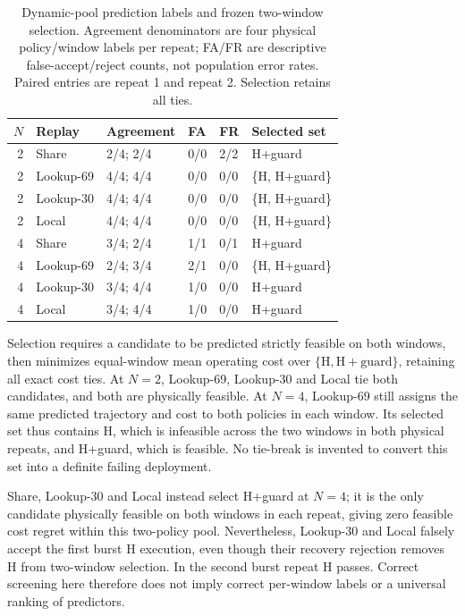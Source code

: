 \begin{table}[t]
\centering\small
\caption{Dynamic-pool prediction labels and frozen two-window selection.
Agreement denominators are four physical policy/window labels per repeat;
FA/FR are descriptive false-accept/reject counts, not population error rates.
Paired entries are repeat 1 and repeat 2.
Selection retains all ties.}
\label{tab:capacity-prediction}
\setlength{\tabcolsep}{3pt}
\begin{tabular*}{\linewidth}{@{\extracolsep{\fill}}rlllll@{}}
\toprule
$N$ & Replay & Agreement & FA & FR & Selected set\\
\midrule
2 & Share & 2/4; 2/4 & 0/0 & 2/2 & H+guard \\
2 & Lookup-69 & 4/4; 4/4 & 0/0 & 0/0 & \{H, H+guard\} \\
2 & Lookup-30 & 4/4; 4/4 & 0/0 & 0/0 & \{H, H+guard\} \\
2 & Local & 4/4; 4/4 & 0/0 & 0/0 & \{H, H+guard\} \\
\midrule
4 & Share & 3/4; 2/4 & 1/1 & 0/1 & H+guard \\
4 & Lookup-69 & 2/4; 3/4 & 2/1 & 0/0 & \{H, H+guard\} \\
4 & Lookup-30 & 3/4; 4/4 & 1/0 & 0/0 & H+guard \\
4 & Local & 3/4; 4/4 & 1/0 & 0/0 & H+guard \\
\bottomrule
\end{tabular*}
\end{table}

Selection requires a candidate to be predicted strictly feasible on both
windows, then minimizes equal-window mean operating cost over
$\{\mathrm{H},\mathrm{H+guard}\}$, retaining all exact cost ties.
At $N=2$, Lookup-69, Lookup-30 and Local tie both candidates, and both are
physically feasible. At $N=4$, Lookup-69 still assigns the same predicted
trajectory and cost to both policies in each window. Its selected set thus
contains H, which is infeasible across the two windows in both physical
repeats, and H+guard, which is feasible. No tie-break is invented to convert
this set into a definite failing deployment.

Share, Lookup-30 and Local instead select H+guard at $N=4$; it is the only
candidate physically feasible on both windows in each repeat, giving zero
feasible cost regret within this two-policy pool. Nevertheless, Lookup-30
and Local falsely accept the first burst H execution, even though their
recovery rejection removes H from two-window selection. In the second
burst repeat H passes. Correct screening here therefore does not imply
correct per-window labels or a universal ranking of predictors.

